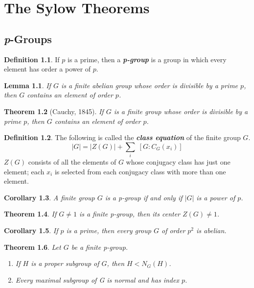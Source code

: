 \documentclass[12pt]{report}
\newtheorem{theorem}{Theorem}[chapter]
\newtheorem{corollary}[theorem]{Corollary}
\newtheorem{lemma}[theorem]{Lemma}
\theoremstyle{definition}
\newtheorem*{definition}{Definition}
\newcommand{\term}[1]{\textbf{\textit{#1}}}
\begin{document}
\chapter{The Sylow Theorems}

\section{\textit{p}-Groups}
\begin{definition}
	If $p$ is a prime, then a \term{p-group} is a group in which every element has order a power of $p$.
\end{definition}

\begin{lemma}
	If $G$ is a finite abelian group whose order is divisible by a prime $p$, then $G$ contains an element of order $p$.
\end{lemma}

\begin{theorem}[Cauchy, 1845]
	If $G$ is a finite group whose order is divisible by a prime $p$, then $G$ contains an element of order $p$.
\end{theorem}

\begin{definition}
	The following is called the \term{class equation} of the finite group $G$.
	\[ |G| = |Z(G)| + \sum_i \; \left[ G : C_G(x_i) \right] \]
	$Z(G)$ consists of all the elements of $G$ whose conjugacy class has just one element; each $x_i$ is selected from each conjugacy class with more than one element.
\end{definition}

\begin{corollary}
	A finite group $G$ is a p-group if and only if $|G|$ is a power of $p$.
\end{corollary}

\begin{theorem}
	If $G\neq 1$ is a finite p-group, then its center $Z(G)\neq 1$.
\end{theorem}

\begin{corollary}
	If $p$ is a prime, then every group $G$ of order $p^2$ is abelian.
\end{corollary}

\begin{theorem}
	Let $G$ be a finite p-group.
	\begin{enumerate}
		\item If $H$ is a proper subgroup of $G$, then $H<N_G(H)$.
		\item Every maximal subgroup of G is normal and has index $p$.
	\end{enumerate}
\end{theorem}
\end{document}
